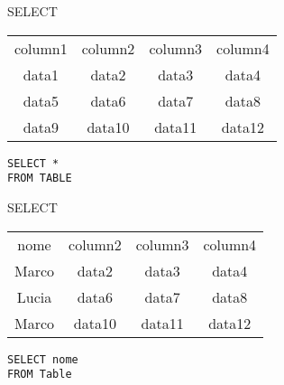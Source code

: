     \begin{frame}{SELECT}
    \begin{table}[h]
    \centering
    \begin{tabular}{|c|c|c|c|}
    \hline
    \rowcolor{cyan!30}\multicolumn{4}{|c|}{Table} \\
    \hline
    \rowcolor{cyan!30}column1 & column2 & column3 & column4 \\
    \hline
    \cellcolor{red!20}data1 & \cellcolor{red!20}data2 & \cellcolor{red!20}data3 & \cellcolor{red!20}data4 \\
    \cellcolor{red!20}data5 & \cellcolor{red!20}data6 & \cellcolor{red!20}data7 & \cellcolor{red!20}data8 \\
    \cellcolor{red!20}data9 & \cellcolor{red!20}data10 & \cellcolor{red!20}data11 & \cellcolor{red!20}data12 \\
    \hline
    \end{tabular}
    \end{table}
    
    \vspace{2em} 
    
    \texttt{SELECT * \\FROM TABLE}
    \end{frame}
    \begin{frame}{SELECT}
    \begin{table}[h]
    \centering
    \begin{tabular}{|c|c|c|c|}
    \hline
    \rowcolor{cyan!30}\multicolumn{4}{|c|}{Table} \\
    \hline
    \rowcolor{cyan!30}nome &  column2 & column3 & column4 \\
    \hline
     Marco &  data2 & data3 & data4 \\
     Lucia &  data6 & data7 & data8 \\
     Marco &  data10 & data11 & data12 \\
    \hline
    \end{tabular}
    \end{table}
    \vspace{2em} 
    
    \texttt{SELECT nome \\FROM Table}
    \end{frame}
